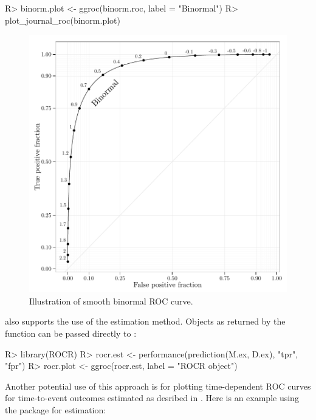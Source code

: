\documentclass[codesnippet]{jss}
\begin{document}
\begin{Schunk}
\begin{Sinput}
R> binorm.plot <- ggroc(binorm.roc, label = "Binormal")
R> plot_journal_roc(binorm.plot)
\end{Sinput}
\begin{figure}
\includegraphics{figure/binormal-1} \caption[Illustration of smooth binormal ROC curve]{Illustration of smooth binormal ROC curve. \label{binorm}}\label{fig:binormal}
\end{figure}
\end{Schunk}

 also supports the use of the  estimation method.
Objects as returned by the function  can be
passed directly to :

\begin{Schunk}
\begin{Sinput}
R> library(ROCR)
R> rocr.est <- performance(prediction(M.ex, D.ex), "tpr", "fpr")
R> rocr.plot <- ggroc(rocr.est, label = "ROCR object")
\end{Sinput}
\end{Schunk}

Another potential use of this approach is for plotting time-dependent
ROC curves for time-to-event outcomes estimated as desribed in
\citep{heagerty2000time}. Here is an example using the 
package \citep{survroc} for estimation:
\end{document}
